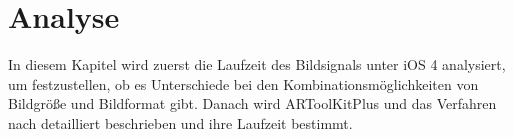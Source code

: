\chapter{Analyse} %
\label{cha:analyse}
\begin{comment}
	Detaillierte Beschreibung der Algorithmen inkl. O-Notation (Detailierte Darstellung der Algorithmen)
	1. ARToolKitPlus
	2. Zissermann/Clarke
	Analyse: Die Auswertung nach den Kriterien aus Kap. Vorgehen OHNE WERTUNG! Nur die Daten erheben und auswerten.
\end{comment}

In diesem Kapitel wird zuerst die Laufzeit des Bildsignals unter iOS 4 analysiert, um festzustellen, ob es Unterschiede
 bei den Kombinationsmöglichkeiten von Bildgröße und Bildformat gibt. Danach wird ARToolKitPlus und das Verfahren
 nach \citeauthor{hirzer08} detailliert beschrieben und ihre Laufzeit bestimmt.







